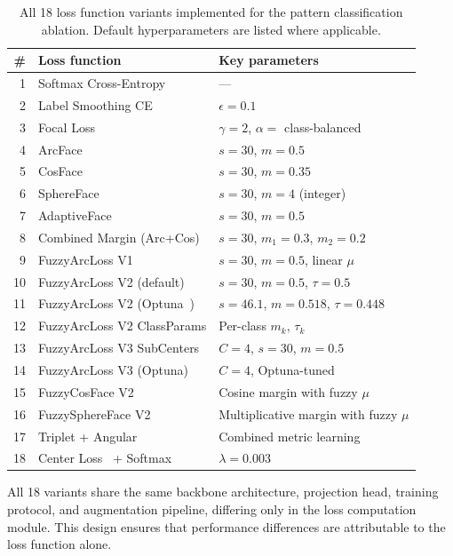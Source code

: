\begin{table}[ht!]
\centering
\small
\caption{All 18 loss function variants implemented for the pattern classification ablation. Default hyperparameters are listed where applicable.}
\label{tab:loss_variants}
\begin{tabular}{r l l}
\hline
\textbf{\#} & \textbf{Loss function} & \textbf{Key parameters} \\
\hline
1  & Softmax Cross-Entropy & --- \\
2  & Label Smoothing CE~\cite{szegedy2016rethinking} & $\epsilon = 0.1$ \\
3  & Focal Loss~\cite{lin2017focal} & $\gamma = 2$, $\alpha = $ class-balanced \\
4  & ArcFace~\cite{deng2019arcface} & $s = 30$, $m = 0.5$ \\
5  & CosFace~\cite{wang2018cosface} & $s = 30$, $m = 0.35$ \\
6  & SphereFace~\cite{liu2017sphereface} & $s = 30$, $m = 4$ (integer) \\
7  & AdaptiveFace~\cite{liu2019adaptiveface} & $s = 30$, $m = 0.5$ \\
8  & Combined Margin (Arc+Cos)~\cite{deng2019arcface} & $s = 30$, $m_1 = 0.3$, $m_2 = 0.2$ \\
9  & FuzzyArcLoss V1~\cite{lima2025fuzzy} & $s = 30$, $m = 0.5$, linear $\mu$ \\
10 & FuzzyArcLoss V2 (default) & $s = 30$, $m = 0.5$, $\tau = 0.5$ \\
11 & FuzzyArcLoss V2 (Optuna~\cite{akiba2019optuna}) & $s = 46.1$, $m = 0.518$, $\tau = 0.448$ \\
12 & FuzzyArcLoss V2 ClassParams & Per-class $m_k$, $\tau_k$ \\
13 & FuzzyArcLoss V3 SubCenters & $C = 4$, $s = 30$, $m = 0.5$ \\
14 & FuzzyArcLoss V3 (Optuna) & $C = 4$, Optuna-tuned \\
15 & FuzzyCosFace V2 & Cosine margin with fuzzy $\mu$ \\
16 & FuzzySphereFace V2 & Multiplicative margin with fuzzy $\mu$ \\
17 & Triplet + Angular & Combined metric learning \\
18 & Center Loss~\cite{wen2016centerloss} + Softmax & $\lambda = 0.003$ \\
\hline
\end{tabular}
\end{table}

All 18 variants share the same backbone architecture, projection head, training protocol, and augmentation pipeline, differing only in the loss computation module.
This design ensures that performance differences are attributable to the loss function alone.

